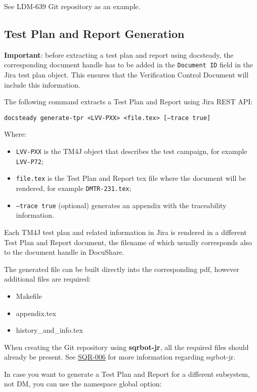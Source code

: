 See LDM-639 Git repository as an example.


\subsection{Test Plan and Report Generation}

\textbf{Important}: before extracting a test plan and report using docsteady,
the corresponding document handle has to be added in the \texttt{Document ID} field in the Jira test plan object.
This ensures that the Verification Control Document will include this information.

The following command extracts a Test Plan and Report using Jira REST API:

\texttt{docsteady generate-tpr <LVV-PXX> <file.tex> [--trace true]}

Where:

\begin{itemize}
\item \texttt{LVV-PXX} is the TM4J object that describes the test campaign, for example \texttt{LVV-P72};
\item \texttt{file.tex} is the Test Plan and Report tex file where the document will be rendered, for example \texttt{DMTR-231.tex};
\item \texttt{--trace true} (optional) generates an appendix with the traceability information.
\end{itemize}

Each TM4J test plan and related information in Jira is rendered in a different Test Plan and Report document,
the filename of which usually corresponds also to the document handle in DocuShare.

The generated file can be built directly into the corresponding pdf, however additional files are required:

\begin{itemize}
\item Makefile
\item appendix.tex
\item history\_and\_info.tex
\end{itemize}

When creating the Git repository using \textbf{sqrbot-jr}, all the required files should already be present.
See \href{https://sqr-006.lsst.io/}{SQR-006} for more information regarding sqrbot-jr.

In case you want to generate a Test Plan and Report for a different subsystem, not DM, you can use the namespace global option:


